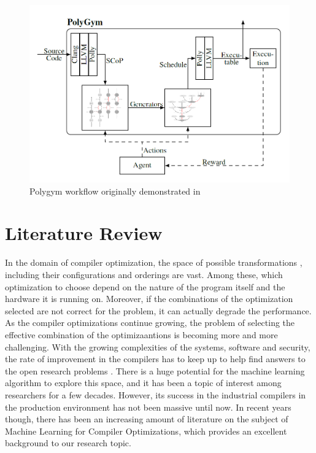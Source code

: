 \documentclass[logo,msc]{infthesis}           %
\begin{document}
\begin{figure}[htbp]
  \centering
  \includegraphics[width=\textwidth]{Images/PolyGym.png}    
  \caption{Polygym workflow originally demonstrated in \cite{P1}}
  \label{fig:polygym}
\end{figure}

\section{Literature Review}

In the domain of compiler optimization, the space of possible transformations
, including their configurations and orderings are vast. Among these, which optimization to choose depend on the nature of the program itself and the hardware it is running on. Moreover, if the combinations of the optimization selected are not correct for the problem, it can actually degrade the performance.  As the compiler optimizations continue growing, the problem of selecting the effective combination of the optimizaantions is becoming more and more challenging.  With the growing complexities of the systems, software and security, the rate of improvement in the compilers has to keep up to help find answers to the open research problems \cite{compilerresearch}. There is a huge potential for the machine learning algorithm to explore this space, and it has been a topic of interest among researchers for a few decades. However, its success in the industrial compilers in the production environment has not been massive until now. In recent years though, there has been an increasing amount of literature on the subject of Machine Learning for Compiler Optimizations, which provides an excellent background to our research topic.
\end{document}
